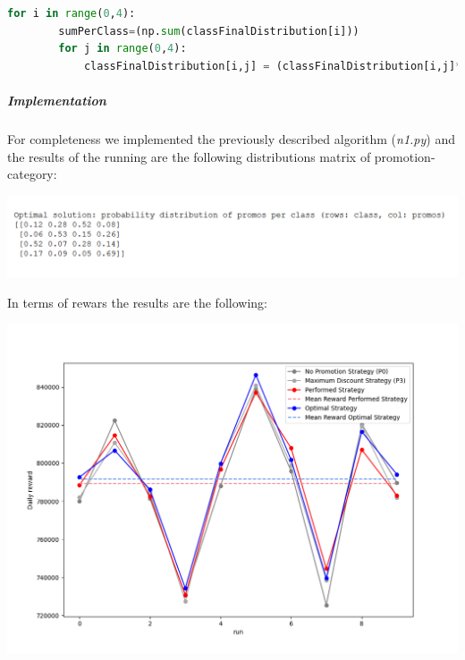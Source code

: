 \begin{enumerate}
	\begin{lstlisting}[basicstyle=\tiny\tt, tabsize=2, language=Python]
	for i in range(0,4):
		sumPerClass=(np.sum(classFinalDistribution[i]))
		for j in range(0,4):
			classFinalDistribution[i,j] = (classFinalDistribution[i,j]*100/sumPerClass)/100 
	\end{lstlisting}	
\end{enumerate}
\subparagraph*{Implementation} For completeness we implemented the previously described algorithm (\textit{n1.py}) and the results of the running are the following distributions matrix of promotion-category:
\begin{center}
	\includegraphics[scale=0.9]{Images/n1_results}
\end{center}
In terms of rewars the results are the following: 
\begin{center}
	\includegraphics[scale=0.7]{Images/n1_chart}
\end{center}





